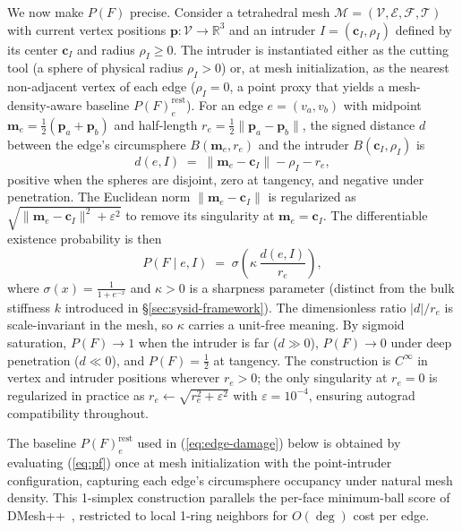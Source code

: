 \documentclass[letterpaper, 10 pt, conference]{ieeeconf}  %
\theoremstyle{tight}
\begin{document}
We now make $P(F)$ precise. Consider a tetrahedral mesh
$\mathcal{M} = (\mathcal{V}, \mathcal{E}, \mathcal{F}, \mathcal{T})$
with current vertex positions $\mathbf{p}: \mathcal{V} \to \mathbb{R}^3$
and an intruder $I = (\mathbf{c}_I, \rho_I)$ defined by its center
$\mathbf{c}_I$ and radius $\rho_I \!\geq\! 0$. The intruder is
instantiated either as the cutting tool (a sphere of physical radius
$\rho_I \!>\! 0$) or, at mesh initialization, as the nearest
non-adjacent vertex of each edge ($\rho_I \!=\! 0$, a point proxy
that yields a mesh-density-aware baseline $P(F)_e^{\text{rest}}$).
For an edge $e = (v_a, v_b)$ with midpoint
$\mathbf{m}_e = \tfrac{1}{2}(\mathbf{p}_a + \mathbf{p}_b)$ and
half-length $r_e = \tfrac{1}{2}\|\mathbf{p}_a - \mathbf{p}_b\|$, the
signed distance $d$ between the edge's circumsphere
$B(\mathbf{m}_e, r_e)$ and the intruder $B(\mathbf{c}_I, \rho_I)$ is
\begin{equation}
  d(e, I) \;=\; \|\mathbf{m}_e - \mathbf{c}_I\| - \rho_I - r_e ,
  \label{eq:sdist}
\end{equation}
positive when the spheres are disjoint, zero at tangency, and negative
under penetration. The Euclidean norm $\|\mathbf{m}_e - \mathbf{c}_I\|$
is regularized as $\sqrt{\|\mathbf{m}_e - \mathbf{c}_I\|^2 + \varepsilon^2}$
to remove its singularity at $\mathbf{m}_e \!=\! \mathbf{c}_I$. The differentiable existence probability is then
\begin{equation}
  P(F \mid e, I)
  \;=\; \sigma\!\left(\kappa\,\frac{d(e, I)}{r_e}\right) ,
  \label{eq:pf}
\end{equation}
where $\sigma(x) = \frac{1}{1+e^{-x}}$ and $\kappa > 0$ is a sharpness
parameter (distinct from the bulk stiffness $k$ introduced in
\S\ref{sec:sysid-framework}). The dimensionless ratio $|d|/r_e$ is
scale-invariant in the mesh, so $\kappa$ carries a unit-free meaning.
By sigmoid saturation, $P(F) \to 1$ when the intruder is far
($d \gg 0$), $P(F) \to 0$ under deep penetration ($d \ll 0$), and
$P(F) = \tfrac{1}{2}$ at tangency. The construction is $C^\infty$ in
vertex and intruder positions wherever $r_e > 0$; the only singularity
at $r_e = 0$ is regularized in practice as
$r_e \!\leftarrow\! \sqrt{r_e^2 + \varepsilon^2}$ with
$\varepsilon \!=\! 10^{-4}$, ensuring autograd compatibility throughout.

The baseline $P(F)_e^{\text{rest}}$ used in (\ref{eq:edge-damage})
below is obtained by evaluating (\ref{eq:pf}) once at mesh
initialization with the point-intruder configuration, capturing each
edge's circumsphere occupancy under natural mesh density. This
1-simplex construction parallels the per-face minimum-ball score of
DMesh++~\cite{son2025dmesh2}, restricted to local 1-ring neighbors
for $O(\deg)$ cost per edge.
\end{document}
